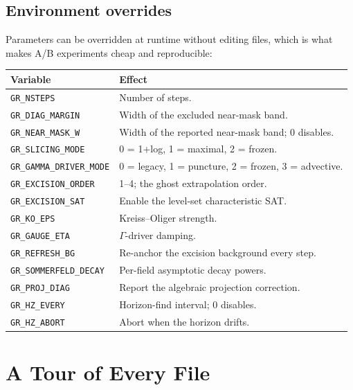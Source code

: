 \subsection{Environment overrides}

Parameters can be overridden at runtime without editing files, which is what
makes A/B experiments cheap and reproducible:

\begin{center}
\begin{tabular}{@{}ll@{}}
\toprule
\textbf{Variable} & \textbf{Effect} \\
\midrule
\texttt{GR\_NSTEPS} & Number of steps. \\
\texttt{GR\_DIAG\_MARGIN} & Width of the excluded near-mask band. \\
\texttt{GR\_NEAR\_MASK\_W} & Width of the reported near-mask band; 0 disables. \\
\texttt{GR\_SLICING\_MODE} & 0 = 1+log, 1 = maximal, 2 = frozen. \\
\texttt{GR\_GAMMA\_DRIVER\_MODE} & 0 = legacy, 1 = puncture, 2 = frozen, 3 = advective. \\
\texttt{GR\_EXCISION\_ORDER} & 1--4; the ghost extrapolation order. \\
\texttt{GR\_EXCISION\_SAT} & Enable the level-set characteristic SAT. \\
\texttt{GR\_KO\_EPS} & Kreiss--Oliger strength. \\
\texttt{GR\_GAUGE\_ETA} & $\Gamma$-driver damping. \\
\texttt{GR\_REFRESH\_BG} & Re-anchor the excision background every step. \\
\texttt{GR\_SOMMERFELD\_DECAY} & Per-field asymptotic decay powers. \\
\texttt{GR\_PROJ\_DIAG} & Report the algebraic projection correction. \\
\texttt{GR\_HZ\_EVERY} & Horizon-find interval; 0 disables. \\
\texttt{GR\_HZ\_ABORT} & Abort when the horizon drifts. \\
\bottomrule
\end{tabular}
\end{center}

\section{A Tour of Every File}
\label{ch:tour}

